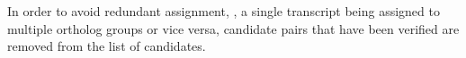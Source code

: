 
In order to avoid redundant assignment, \ie, a single transcript being assigned
to multiple ortholog groups or vice versa, candidate pairs that have been
verified are removed from the list of candidates. 


